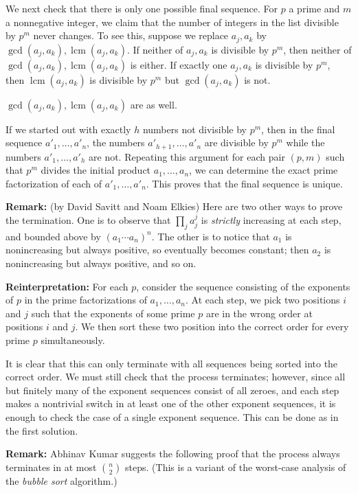 \documentclass[amssymb,twocolumn,pra,10pt,aps]{revtex4-1}
\DeclareMathOperator{\lcm}{lcm}
\begin{document}
\begin{itemize}
We next check that there is only one possible final sequence.
For $p$ a prime and $m$ a nonnegative integer, we claim that the number
of integers in the list divisible by $p^m$ never changes. To see this,
suppose we replace $a_j, a_k$ by $\gcd(a_j, a_k),\lcm(a_j,a_k)$.
If neither of $a_j, a_k$ is divisible by $p^m$, then neither of
$\gcd(a_j, a_k),\lcm(a_j,a_k)$ is either.
If exactly one $a_j, a_k$ is divisible by $p^m$, then
$\lcm(a_j,a_k)$ is divisible by $p^m$ but $\gcd(a_j, a_k)$ is not.

$\gcd(a_j, a_k),\lcm(a_j,a_k)$ are as well.

If we started out with exactly $h$ numbers not divisible by $p^m$,
then in the final sequence $a'_1, \dots, a'_n$, the numbers
$a'_{h+1}, \dots, a'_n$ are divisible by $p^m$ while the numbers
$a'_1, \dots, a'_h$ are not. Repeating this argument for each
pair $(p,m)$ such that $p^m$ divides the initial product
$a_1,\dots,a_n$, we can determine the exact prime factorization
of each of $a'_1,\dots,a'_n$. This proves that the final sequence
is unique.

\textbf{Remark:}
(by David Savitt and Noam Elkies)
Here are two other ways to prove the termination.
One is to observe that $\prod_j a_j^j$
is \emph{strictly} increasing at each step, and bounded above by
$(a_1\cdots a_n)^n$. The other is to notice that $a_1$ is nonincreasing
but always positive, so eventually becomes constant; then
$a_2$ is nonincreasing but always positive, and so on.

\textbf{Reinterpretation:}
For each $p$, consider the sequence consisting of the
exponents of $p$ in the prime factorizations of $a_1,\dots,a_n$.
At each step, we pick two positions $i$ and $j$ such that the exponents
of some prime $p$ are in the wrong order at positions $i$ and $j$.
We then sort these two position into the correct order for every prime $p$
simultaneously.

It is clear that this can only terminate with all sequences being sorted
into the correct order. We must still check that the process terminates;
however, since all but finitely many of the exponent
sequences consist of all zeroes,
and each step makes a nontrivial switch in at least one of the other exponent
sequences, it is enough to check the case of a single exponent sequence.
This can be done as in the first solution.

\textbf{Remark:}
Abhinav Kumar suggests the following proof that the process always terminates
in at most  $\binom{n}{2}$ steps.
(This is a variant of the worst-case analysis of the \emph{bubble sort}
algorithm.)


\end{itemize}
\end{document}
